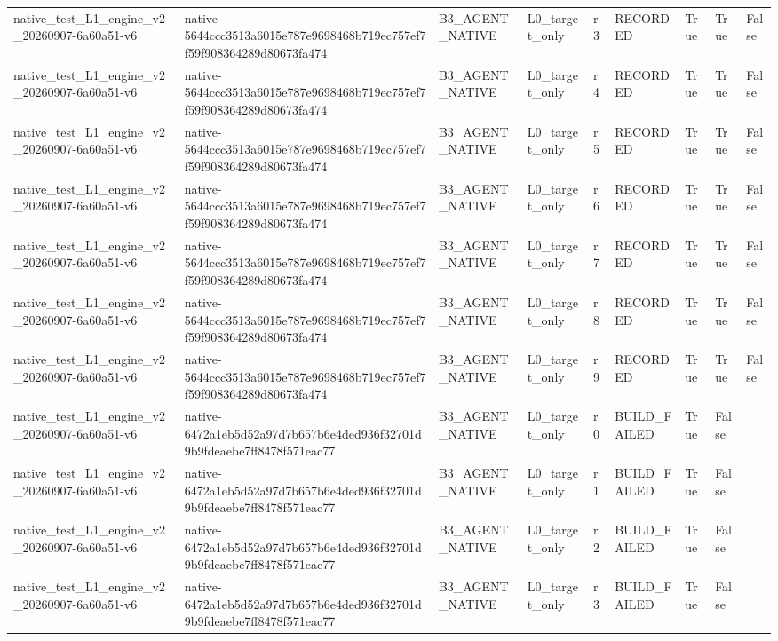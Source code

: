 \begin{tabular}{lllllllll}
native\_test\_L1\_engine\_v2\_20260907-6a60a51-v6 & native-5644ccc3513a6015e787e9698468b719ec757ef7f59f908364289d80673fa474 & B3\_AGENT\_NATIVE & L0\_target\_only & r3 & RECORDED & True & True & False \\
native\_test\_L1\_engine\_v2\_20260907-6a60a51-v6 & native-5644ccc3513a6015e787e9698468b719ec757ef7f59f908364289d80673fa474 & B3\_AGENT\_NATIVE & L0\_target\_only & r4 & RECORDED & True & True & False \\
native\_test\_L1\_engine\_v2\_20260907-6a60a51-v6 & native-5644ccc3513a6015e787e9698468b719ec757ef7f59f908364289d80673fa474 & B3\_AGENT\_NATIVE & L0\_target\_only & r5 & RECORDED & True & True & False \\
native\_test\_L1\_engine\_v2\_20260907-6a60a51-v6 & native-5644ccc3513a6015e787e9698468b719ec757ef7f59f908364289d80673fa474 & B3\_AGENT\_NATIVE & L0\_target\_only & r6 & RECORDED & True & True & False \\
native\_test\_L1\_engine\_v2\_20260907-6a60a51-v6 & native-5644ccc3513a6015e787e9698468b719ec757ef7f59f908364289d80673fa474 & B3\_AGENT\_NATIVE & L0\_target\_only & r7 & RECORDED & True & True & False \\
native\_test\_L1\_engine\_v2\_20260907-6a60a51-v6 & native-5644ccc3513a6015e787e9698468b719ec757ef7f59f908364289d80673fa474 & B3\_AGENT\_NATIVE & L0\_target\_only & r8 & RECORDED & True & True & False \\
native\_test\_L1\_engine\_v2\_20260907-6a60a51-v6 & native-5644ccc3513a6015e787e9698468b719ec757ef7f59f908364289d80673fa474 & B3\_AGENT\_NATIVE & L0\_target\_only & r9 & RECORDED & True & True & False \\
native\_test\_L1\_engine\_v2\_20260907-6a60a51-v6 & native-6472a1eb5d52a97d7b657b6e4ded936f32701d9b9fdeaebe7ff8478f571eac77 & B3\_AGENT\_NATIVE & L0\_target\_only & r0 & BUILD\_FAILED & True & False &  \\
native\_test\_L1\_engine\_v2\_20260907-6a60a51-v6 & native-6472a1eb5d52a97d7b657b6e4ded936f32701d9b9fdeaebe7ff8478f571eac77 & B3\_AGENT\_NATIVE & L0\_target\_only & r1 & BUILD\_FAILED & True & False &  \\
native\_test\_L1\_engine\_v2\_20260907-6a60a51-v6 & native-6472a1eb5d52a97d7b657b6e4ded936f32701d9b9fdeaebe7ff8478f571eac77 & B3\_AGENT\_NATIVE & L0\_target\_only & r2 & BUILD\_FAILED & True & False &  \\
native\_test\_L1\_engine\_v2\_20260907-6a60a51-v6 & native-6472a1eb5d52a97d7b657b6e4ded936f32701d9b9fdeaebe7ff8478f571eac77 & B3\_AGENT\_NATIVE & L0\_target\_only & r3 & BUILD\_FAILED & True & False &  \\

\end{tabular}
